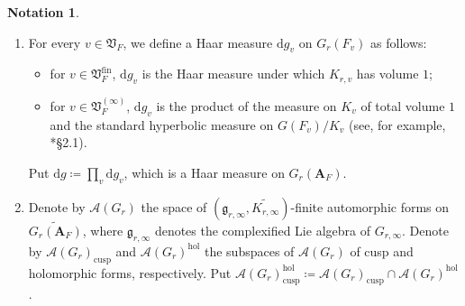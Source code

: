 \documentclass[12pt]{amsart}
\numberwithin{equation}{section}
\theoremstyle{plain}
\theoremstyle{definition}
\newtheorem{notation}[proposition]{Notation}
\theoremstyle{remark}
\renewcommand{\b}[1]{\mathbf{#1}}
\renewcommand{\c}[1]{\mathcal{#1}}
\newcommand{\f}[1]{\mathfrak{#1}}
\renewcommand{\r}[1]{\mathrm{#1}}
\renewcommand{\(}{\left(}
\renewcommand{\)}{\right)}
\newcommand{\bA}{\b A}
\newcommand{\cA}{\c A}
\newcommand{\fV}{\f V}
\newcommand{\fg}{\f g}
\newcommand{\cusp}{\r{cusp}}
\newcommand{\fin}{\r{fin}}
\newcommand{\hol}{\r{hol}}
\begin{document}
\begin{notation}
\begin{enumerate}
  \item For every $v\in\fV_F$, we define a Haar measure $\r{d}g_v$ on $G_r(F_v)$ as follows:
    \begin{itemize}
      \item for $v\in\fV_F^\fin$, $\r{d}g_v$ is the Haar measure under which $K_{r,v}$ has volume $1$;

      \item for $v\in\fV_F^{(\infty)}$, $\r{d}g_v$ is the product of the measure on $K_v$ of total volume $1$ and the standard hyperbolic measure on $G(F_v)/K_v$ (see, for example, \cite{EL24}*{\S2.1}).
    \end{itemize}
    Put $\r{d}g\coloneqq\prod_{v}\r{d}g_v$, which is a Haar measure on $G_r(\bA_F)$.

  \item Denote by $\cA(G_r)$ the space of $(\fg_{r,\infty},\widetilde{K_{r,\infty}})$-finite automorphic forms on $\widetilde{G_r(\bA_F)}$, where $\fg_{r,\infty}$ denotes the complexified Lie algebra of $G_{r,\infty}$. Denote by $\cA(G_r)_\cusp$ and $\cA(G_r)^\hol$ the subspaces of $\cA(G_r)$ of cusp and holomorphic forms, respectively. Put $\cA(G_r)_\cusp^\hol\coloneqq\cA(G_r)_\cusp\cap\cA(G_r)^\hol$.
\end{enumerate}
\end{notation}
\end{document}
